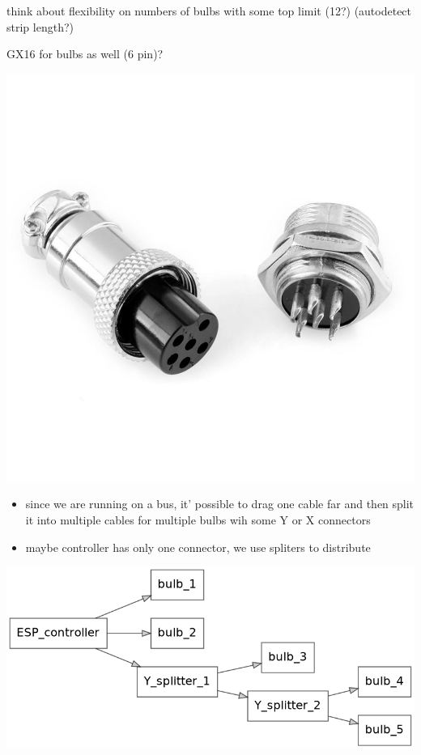 \documentclass[11pt]{article}
\begin{document}
think about flexibility on numbers of bulbs with some top limit (12?) (autodetect strip length?)

GX16 for bulbs as well (6 pin)?
  \begin{center}
\includegraphics[width=.9\linewidth]{./samples/bulbconnector1.jpg}
\end{center}

\begin{itemize}
\item since we are running on a bus, it' possible to drag one cable far and then split it into multiple cables for multiple bulbs wih some Y or X connectors

\item maybe controller has only one connector, we use spliters to distribute
\end{itemize}


\begin{center}
\includegraphics[width=.9\linewidth]{splitter.png}
\end{center}
\end{document}
